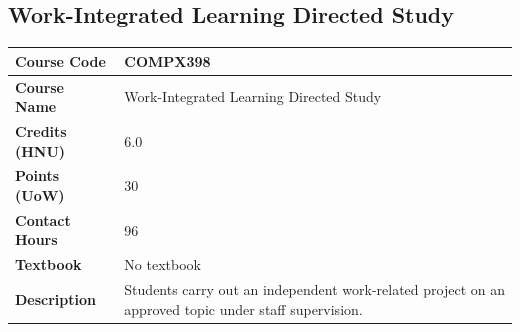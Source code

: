 \documentclass{article}
\begin{document}
\subsection[COMPX398 Work-Integrated Learning Directed Study]{Work-Integrated Learning Directed Study}
\renewcommand{\arraystretch}{1.5} %
\begin{longtable}{|p{3cm}|p{10cm}|}
\hline
\textbf{Course Code} & COMPX398 \\
\hline
\textbf{Course Name} & Work-Integrated Learning Directed Study \\
\hline
\textbf{Credits (HNU)} & 6.0 \\
\hline
\textbf{Points (UoW)} & 30 \\
\hline
\textbf{Contact Hours} & 96 \\
\hline
\textbf{Textbook} & No textbook \\
\hline
\textbf{Description} & Students carry out an independent work-related project on an approved topic under staff supervision. \\
\hline
\end{longtable}
\end{document}
